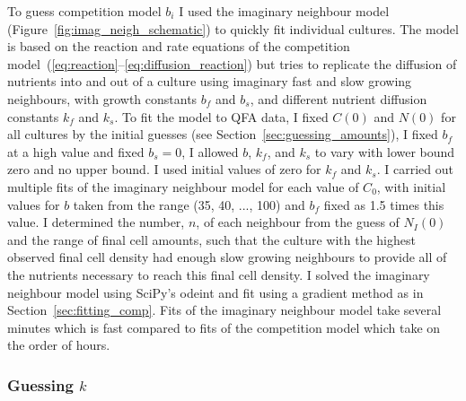 
To guess competition model \(b_{i}\) I used the imaginary neighbour
model (Figure~\ref{fig:imag_neigh_schematic}) to quickly fit
individual cultures. The model is based on the reaction and rate
equations of the competition
model~(\ref{eq:reaction}--\ref{eq:diffusion_reaction}) but tries to
replicate the diffusion of nutrients into and out of a culture using
imaginary fast and slow growing neighbours, with growth constants
\(b_{f}\) and \(b_{s}\), and different nutrient diffusion constants
\(k_{f}\) and \(k_{s}\). To fit the model to QFA data, I fixed
\(C(0)\) and \(N(0)\) for all cultures by the initial guesses (see
Section~\ref{sec:guessing_amounts}), I fixed \(b_{f}\) at a high value
and fixed \(b_{s} = 0\), I allowed \(b\), \(k_{f}\), and \(k_{s}\) to
vary with lower bound zero and no upper bound. I used initial values
of zero for \(k_{f}\) and \(k_{s}\). I carried out multiple fits of
the imaginary neighbour model for each value of \(C_{0}\), with
initial values for \(b\) taken from the range (35, 40, ..., 100) and
\(b_{f}\) fixed as 1.5 times this value. I determined the number,
\(n\), of each neighbour from the guess of \(N_{I}(0)\) and the range
of final cell amounts, such that the culture with the highest observed
final cell density had enough slow growing neighbours to provide all
of the nutrients necessary to reach this final cell density. I solved
the imaginary neighbour model using SciPy's odeint and fit using a
gradient method as in Section~\ref{sec:fitting_comp}. Fits of the
imaginary neighbour model take several minutes which is fast compared
to fits of the competition model which take on the order of hours.


\subsubsection{\boldmath Guessing \(k\) \unboldmath}

